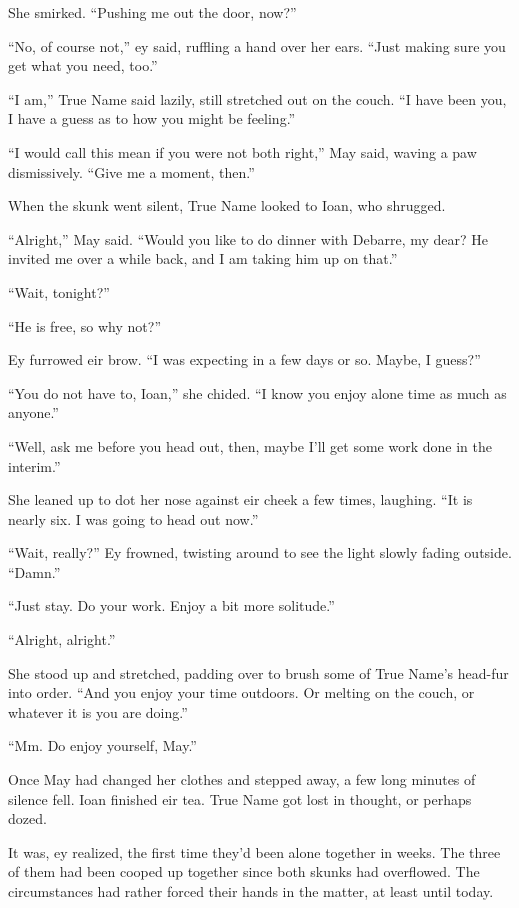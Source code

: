 She smirked. ``Pushing me out the door, now?''

``No, of course not,'' ey said, ruffling a hand over her ears. ``Just making sure you get what you need, too.''

``I am,'' True Name said lazily, still stretched out on the couch. ``I have been you, I have a guess as to how you might be feeling.''

``I would call this mean if you were not both right,'' May said, waving a paw dismissively. ``Give me a moment, then.''

When the skunk went silent, True Name looked to Ioan, who shrugged.

``Alright,'' May said. ``Would you like to do dinner with Debarre, my dear? He invited me over a while back, and I am taking him up on that.''

``Wait, tonight?''

``He is free, so why not?''

Ey furrowed eir brow. ``I was expecting in a few days or so. Maybe, I guess?''

``You do not have to, Ioan,'' she chided. ``I know you enjoy alone time as much as anyone.''

``Well, ask me before you head out, then, maybe I'll get some work done in the interim.''

She leaned up to dot her nose against eir cheek a few times, laughing. ``It is nearly six. I was going to head out now.''

``Wait, really?'' Ey frowned, twisting around to see the light slowly fading outside. ``Damn.''

``Just stay. Do your work. Enjoy a bit more solitude.''

``Alright, alright.''

She stood up and stretched, padding over to brush some of True Name's head-fur into order. ``And you enjoy your time outdoors. Or melting on the couch, or whatever it is you are doing.''

``Mm. Do enjoy yourself, May.''

Once May had changed her clothes and stepped away, a few long minutes of silence fell. Ioan finished eir tea. True Name got lost in thought, or perhaps dozed.

It was, ey realized, the first time they'd been alone together in weeks. The three of them had been cooped up together since both skunks had overflowed. The circumstances had rather forced their hands in the matter, at least until today.

